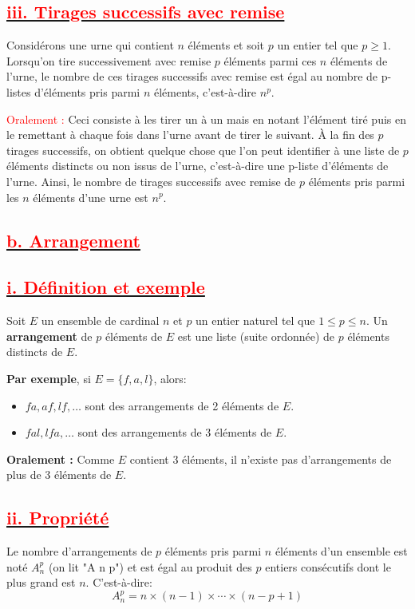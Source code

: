 \documentclass[12pt]{article}
\begin{document}
\subsection*{\underline{\textbf{\textcolor{red}{iii. Tirages successifs avec remise}}}}
Considérons une urne qui contient \(n\) éléments et soit \(p\) un entier tel que \(p \geq 1\). Lorsqu'on tire successivement avec remise \(p\) éléments parmi ces \(n\) éléments de l’urne, le nombre de ces tirages successifs avec remise est égal au nombre de p-listes d’éléments pris parmi \(n\) éléments, c’est-à-dire \(n^{p}\).

\textcolor{red}{Oralement :} Ceci consiste à les tirer un à un mais en notant l’élément tiré puis en le remettant à chaque fois dans l’urne avant de tirer le suivant. À la fin des \(p\) tirages successifs, on obtient quelque chose que l’on peut identifier à une liste de \(p\) éléments distincts ou non issus de l’urne, c’est-à-dire une p-liste d’éléments de l’urne. Ainsi, le nombre de tirages successifs avec remise de \(p\) éléments pris parmi les \(n\) éléments d’une urne est \(n^{p}\).
\subsection*{\underline{\textbf{\textcolor{red}{b. Arrangement}}}}
\subsection*{\underline{\textbf{\textcolor{red}{i. Définition et exemple}}}}
Soit \( E \) un ensemble de cardinal \( n \) et \( p \) un entier naturel tel que \( 1 \leq p \leq n \). Un \textbf{arrangement} de \( p \) éléments de \( E \) est une liste (suite ordonnée) de \( p \) éléments distincts de \( E \).

\textbf{Par exemple}, si \( E = \{f, a, l\} \), alors:
\begin{itemize}
    \item \( fa, af, lf, \ldots \) sont des arrangements de 2 éléments de \( E \).
    \item \( fal, lfa, \ldots \) sont des arrangements de 3 éléments de \( E \).
\end{itemize}

\textbf{Oralement :} Comme \( E \) contient 3 éléments, il n’existe pas d’arrangements de plus de 3 éléments de \( E \).
\subsection*{\underline{\textbf{\textcolor{red}{ii. Propriété}}}}
Le nombre d'arrangements de \( p \) éléments pris parmi \( n \) éléments d'un ensemble est noté \( A_n^p \) (on lit "A n p") et est égal au produit des \( p \) entiers consécutifs dont le plus grand est \( n \). C'est-à-dire:
\[
A_n^p = n \times (n-1) \times \cdots \times (n-p+1)
\]
\end{document}
